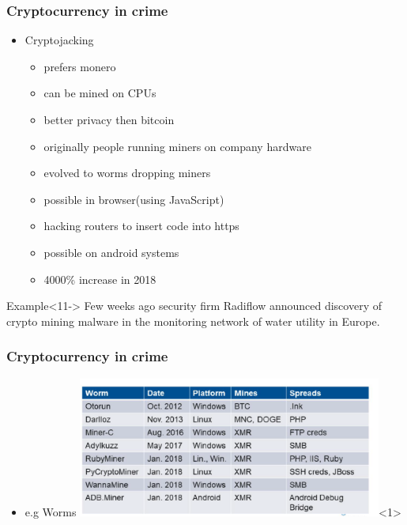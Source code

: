 \documentclass{beamer}
\begin{document}
\begin{frame}
    \frametitle{Cryptocurrency in crime}
        \begin{itemize}
            \item<1-> Cryptojacking
            \begin{itemize}
                \item<2-> prefers monero
                \item<3-> can be mined on CPUs
                \item<4-> better privacy then bitcoin
                \item<5-> originally people running miners on company hardware
                \item<6-> evolved to worms dropping miners
                \item<7-> possible in browser(using JavaScript)
                \item<8-> hacking routers to insert code into https
                \item<9-> possible on android systems
                \item<10-> 4000\% increase in 2018 
            \end{itemize}
        \end{itemize}
        \begin{exampleblock}{Example}<11->
            Few weeks ago security firm Radiflow announced discovery of crypto mining
            malware in the monitoring network of water utility in Europe.
        \end{exampleblock}                
\end{frame}    
\begin{frame}
    \frametitle{Cryptocurrency in crime}
        \begin{itemize}
            \item<1> e.g Worms
            \includegraphics[width=100mm]{worms-chart.png}<1>
        \end{itemize}
\end{frame}
\end{document}
